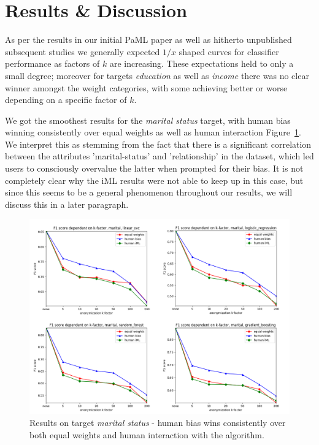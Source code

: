 \documentclass{llncs}
\begin{document}
\section{Results \& Discussion}
\label{sect:results}

As per the results in our initial PaML paper \cite{malle2016right} as well as hitherto unpublished subsequent studies we generally expected $1/x$ shaped curves for classifier performance as factors of $k$ are increasing. These expectations held to only a small degree; moreover for targets \textit{education} as well as \textit{income} there was no clear winner amongst the weight categories, with some achieving better or worse depending on a specific factor of $k$.

We got the smoothest results for the \textit{marital status} target, with human bias winning consistently over equal weights as well as human interaction Figure~\ref{fig:results_marital}. We interpret this as stemming from the fact that there is a significant correlation between the attributes 'marital-status' and 'relationship' in the dataset, which led users to consciously overvalue the latter when prompted for their bias. It is not completely clear why the iML results were not able to keep up in this case, but since this seems to be a general phenomenon throughout our results, we will discuss this in a later paragraph.

\begin{figure}[!h]
	\begin{center}
		\includegraphics[width=1\textwidth]{figures/marital_status.png}
		\caption{Results on target \textit{marital status} - human bias wins consistently over both equal weights and human interaction with the algorithm.}
		\label{fig:results_marital}
	\end{center}
\end{figure}
\end{document}

